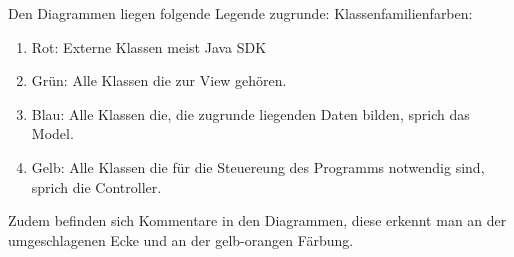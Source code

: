 \documentclass{scrartcl}
\begin{document}
Den Diagrammen liegen folgende Legende zugrunde:
	Klassenfamilienfarben:
	\begin{enumerate}
		\item Rot: Externe Klassen meist Java SDK
		\item Grün: Alle Klassen die zur View gehören.
		\item Blau: Alle Klassen die, die zugrunde liegenden Daten bilden, sprich das Model.
		\item Gelb: Alle Klassen die für die Steuereung des Programms notwendig sind, sprich die Controller.
	\end{enumerate}
	Zudem befinden sich Kommentare in den Diagrammen, diese erkennt man an der umgeschlagenen Ecke und an der gelb-orangen Färbung.
\end{document}
